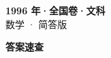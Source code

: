 \documentclass[zihao=-4, a4paper]{ctexart}
\begin{document}
\begin{center}
  {\Large\bfseries 1996 年·全国卷·文科}\\[4pt]
  {\large 数学 · 简答版}
\end{center}
\medskip
{}

\clearpage
{}
\begin{center}{\Large\bfseries 答案速查}\end{center}
\medskip

\end{document}
